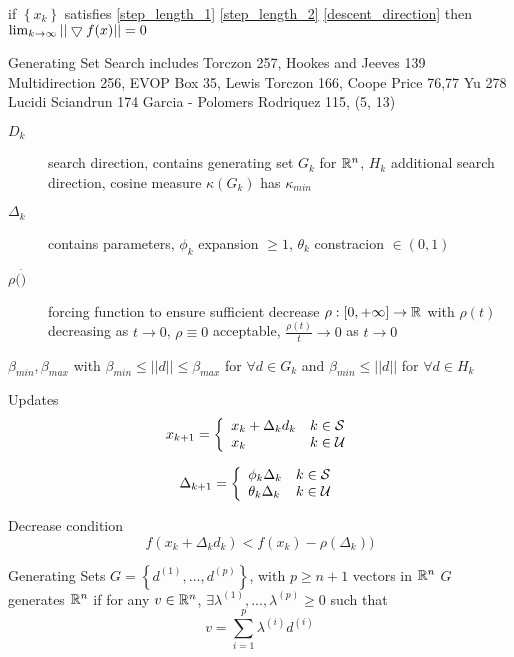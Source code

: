 if $\left\{x_k\right\}$ satisfies \ref{step_length_1} \ref{step_length_2} \ref{descent_direction}
then $\lim_{k\rightarrow \infty } || \bigtriangledown f(x) || = 0$

Generating Set Search
includes Torczon 257, Hookes and Jeeves 139 Multidirection 256, EVOP Box 35, Lewis Torczon 166, Coope Price 76,77 Yu 278 Lucidi Sciandrun 174 Garcia - Polomers Rodriquez 115,     (5, 13)

\begin{description}
\item[$D_k$] search direction, contains generating set $G_k$ for $\mathbb{R}^{n}$, $H_k$ additional search direction, 
cosine measure $\kappa (G_k)$ has $\kappa_{min}$
\item[$\Delta_k$] contains parameters, $\phi_k$ expansion $\ge 1$, $\theta_k $ constracion $\in (0,1)$
\item[$\rho ( \dot )$] forcing function to ensure sufficient decrease $\rho : \left[ 0 , + \infty \right] \rightarrow \mathbb{R}^{}$ with $\rho(t)$ decreasing as $t \rightarrow 0$, $\rho \equiv 0$ acceptable, $\frac{\rho (t)}{t} \rightarrow 0 $ as $t\rightarrow 0$ 
\end{description}

$\beta_{min}, \beta_{max}$
with $\beta_{min} \le ||d|| \le \beta_{max} $ for $\forall d \in G_k$ and $\beta_{min} \le || d ||$ for $\forall d \in H_k$

Updates
\begin{equation}
x_{k+1} = \left\{  \begin{array}{l l}
						x_k + \Delta_k d_k  	&	k \in \mathcal{S} \\
						x_k					&	k \in \mathcal{U} 
					\end{array}
			\right.
\end{equation}


\begin{equation}
\Delta_{k+1} = \left\{  \begin{array}{l l}
						\phi_k \Delta_k  		&	k \in \mathcal{S} \\
						\theta_k \Delta_k	&	k \in \mathcal{U} 
					\end{array}
			\right.
\end{equation}

Decrease condition
\begin{equation}
f(x_k  + \Delta_k d_k ) < f(x_k) - \rho ( \Delta_k))
\end{equation}

Generating Sets
$G = \left\{ d^{(1)} , ... , d^{(p)} \right\}$, with $p \ge n+1$ vectors in $\mathbb{R}^{n}$
$G$ generates $\mathbb{R}^{n}$ if for any $v\in \mathbb{R}^{n}$, $\exists \lambda^{(1)}, ..., \lambda^{(p)} \ge 0$ such that
\begin{equation}
v = \sum_{i=1}^p \lambda^{(i)} d^{(i)}
\end{equation}

